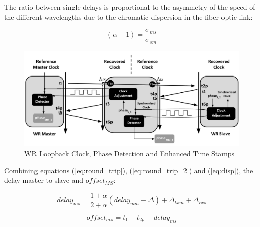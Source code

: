 The ratio between single delays is proportional to the asymmetry of the speed of
the different wavelengths due to the chromatic dispersion in the fiber optic
link:

\begin{equation}
    \label{eq:disp}
    (\alpha-1) = \frac{\sigma_{ms}}{\sigma_{sm}}
\end{equation}

\begin{figure}[!t]
\centering
\includegraphics[scale=0.26]{fig/time_stamps_tc.png}
\caption{WR Loopback Clock, Phase Detection and Enhanced Time Stamps}
\label{fig:wr_time_stamp}
\end{figure}


Combining equations (\ref{eq:round_trip}), (\ref{eq:round_trip_2}) and
(\ref{eq:disp}), the delay master to slave and $offset_{MS}$:

\begin{equation}
    \label{eq:delayms}
     delay_{ms} = \frac{1+ \alpha}{2+ \alpha}(delay_{mm} - \Delta)+ \Delta_{txm} + \Delta_{rxs} 
\end{equation}

\begin{equation}
    \label{eq:offsetms}
    offset_{ms} = t_{1} - t_{2p} - delay_{ms}
\end{equation}

